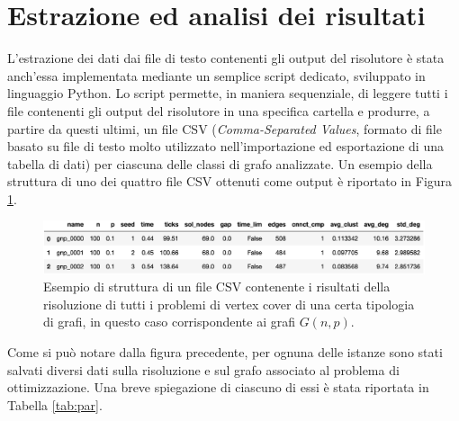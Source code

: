 


\section{Estrazione ed analisi dei risultati}
L'estrazione dei dati dai file di testo contenenti gli output del risolutore è stata anch'essa implementata mediante un semplice script dedicato, sviluppato in linguaggio Python. Lo script permette, in maniera sequenziale, di leggere tutti i file contenenti gli output del risolutore in una specifica cartella e produrre, a partire da questi ultimi, un file CSV (\textit{Comma-Separated Values}, formato di file basato su file di testo molto utilizzato nell'importazione ed esportazione di una tabella di dati) per ciascuna delle classi di grafo analizzate. Un esempio della struttura di uno dei quattro file CSV ottenuti come output è riportato in Figura \ref{fig:csv}.

\begin{figure}[h!]
     \centering
       \includegraphics[scale=0.6]{images/csv.eps}
       \caption{Esempio di struttura di un file CSV contenente i risultati della risoluzione di tutti i problemi di vertex cover di una certa tipologia di grafi, in questo caso corrispondente ai grafi $G(n,p)$.}
        \label{fig:csv}
\end{figure}

Come si può notare dalla figura precedente, per ognuna delle istanze sono stati salvati diversi dati sulla risoluzione e sul grafo associato al problema di ottimizzazione. Una breve spiegazione di ciascuno di essi è stata riportata in Tabella \ref{tab:par}.

